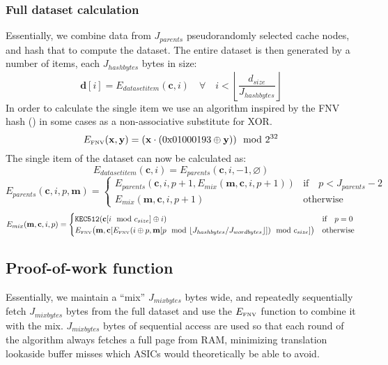 \documentclass[9pt,oneside]{amsart}
\begin{document}
\subsubsection{Full dataset calculation} \label{dataset}
Essentially, we combine data from $J_{parents}$ pseudorandomly selected cache nodes, and hash that to compute the dataset. The entire dataset is then generated by a number of items, each $J_{hashbytes}$ bytes in size:
\begin{equation}
 \mathbf{d}[i] = E_{datasetitem}(\mathbf{c}, i) \quad \forall \quad i < \left\lfloor\frac{d_{size}}{J_{hashbytes}}\right\rfloor
\end{equation}
In order to calculate the single item we use an algorithm inspired by the FNV hash (\cite{FowlerNollVo1991FNVHash}) in some cases as a non-associative substitute for XOR.
\begin{equation}
 E_\text{\tiny FNV}(\mathbf{x}, \mathbf{y}) = (\mathbf{x} \cdot (\mathrm{0x01000193} \oplus \mathbf{y})) \mod 2^{32}
\end{equation}
The single item of the dataset can now be calculated as:
\begin{equation}
 E_{datasetitem}(\mathbf{c}, i) = E_{parents}(\mathbf{c}, i, -1, \varnothing)
\end{equation}
\begin{equation}
  E_{parents}(\mathbf{c}, i, p, \mathbf{m}) = \begin{cases}
E_{parents}(\mathbf{c}, i, p +1, E_{mix}(\mathbf{m}, \mathbf{c}, i, p + 1)) & \text{if} \quad p < J_{parents} -2 \\
E_{mix}(\mathbf{m}, \mathbf{c}, i, p + 1) & \text{otherwise}
\end{cases}
\end{equation}
\begin{equation}
 E_{mix}(\mathbf{m}, \mathbf{c}, i, p) = \begin{cases}
\texttt{KEC512}(\mathbf{c}[i \mod c_{size}] \oplus i) & \text{if} \quad p = 0 \\
E_\text{\tiny FNV}\big(\mathbf{m}, \mathbf{c}[E_\text{\tiny FNV}(i \oplus p, \mathbf{m}[p \mod \lfloor J_{hashbytes} / J_{wordbytes} \rfloor]) \mod c_{size}] \big) & \text{otherwise}
\end{cases}
\end{equation}

\subsection{Proof-of-work function}
Essentially, we maintain a ``mix'' $J_{mixbytes}$ bytes wide, and repeatedly sequentially fetch $J_{mixbytes}$ bytes from the full dataset and use the $E_\text{\tiny FNV}$ function to combine it with the mix. $J_{mixbytes}$ bytes of sequential access are used so that each round of the algorithm always fetches a full page from RAM, minimizing translation lookaside buffer misses which ASICs would theoretically be able to avoid.
\end{document}
